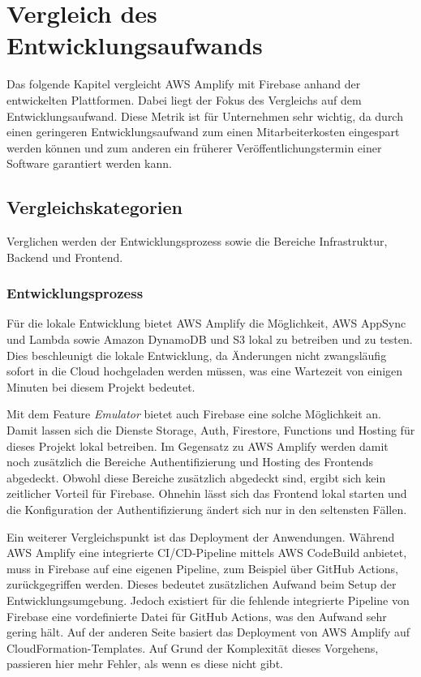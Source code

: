 \chapter{Vergleich des Entwicklungsaufwands}
\label{kap6}

Das folgende Kapitel vergleicht \ac{AWS} Amplify mit Firebase anhand der entwickelten Plattformen. Dabei liegt der Fokus des Vergleichs auf dem Entwicklungsaufwand. Diese Metrik ist für Unternehmen sehr wichtig, da durch einen geringeren Entwicklungsaufwand zum einen Mitarbeiterkosten eingespart werden können und zum anderen ein früherer Veröffentlichungstermin einer Software garantiert werden kann.

\section{Vergleichskategorien}

Verglichen werden der Entwicklungsprozess sowie die Bereiche Infrastruktur, Backend und Frontend.

\subsection{Entwicklungsprozess}

Für die lokale Entwicklung bietet \ac{AWS} Amplify die Möglichkeit, \ac{AWS} AppSync und Lambda sowie Amazon DynamoDB und S3 lokal zu betreiben und zu testen. Dies beschleunigt die lokale Entwicklung, da Änderungen nicht zwangsläufig sofort in die Cloud hochgeladen werden müssen, was eine Wartezeit von einigen Minuten bei diesem Projekt bedeutet.

Mit dem Feature \textit{Emulator} bietet auch Firebase eine solche Möglichkeit an. Damit lassen sich die Dienste Storage, Auth, Firestore, Functions und Hosting für dieses Projekt lokal betreiben. Im Gegensatz zu \ac{AWS} Amplify werden damit noch zusätzlich die Bereiche Authentifizierung und Hosting des Frontends abgedeckt. Obwohl diese Bereiche zusätzlich abgedeckt sind, ergibt sich kein zeitlicher Vorteil für Firebase. Ohnehin lässt sich das Frontend lokal starten und die Konfiguration der Authentifizierung ändert sich nur in den seltensten Fällen.

Ein weiterer Vergleichspunkt ist das Deployment der Anwendungen. Während \ac{AWS} Amplify eine integrierte CI/CD-Pipeline mittels \ac{AWS} CodeBuild anbietet, muss in Firebase auf eine eigenen Pipeline, zum Beispiel über GitHub Actions, zurückgegriffen werden. Dieses bedeutet zusätzlichen Aufwand beim Setup der Entwicklungsumgebung. Jedoch existiert für die fehlende integrierte Pipeline von Firebase eine vordefinierte Datei für GitHub Actions, was den Aufwand sehr gering hält. Auf der anderen Seite basiert das Deployment von \ac{AWS} Amplify auf CloudFormation-Templates. Auf Grund der Komplexität dieses Vorgehens, passieren hier mehr Fehler, als wenn es diese nicht gibt.

